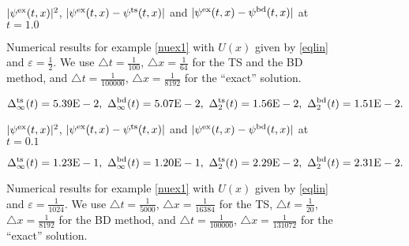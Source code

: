 \documentclass[leqno,final]{siamltex}
\numberwithin{equation}{section}
\newcounter{me}
\begin{document}
\begin{figure} \footnotesize
\begin{center}

$|\psi^{\rm ex}(t,x)|^2$, $|\psi^{\rm ex}(t,x)-\psi^{\rm
ts}(t,x)|$ and $|\psi^{\rm ex}(t,x)-\psi^{\rm bd}(t,x)|$ at
$t=1.0$
\vspace{-1mm} \caption{Numerical results for example
\ref{nuex1} with $U(x)$ given by \eqref{eqlin} and ${{\varepsilon }}={\frac{{1}}{{2}}}$.
We use ${\triangle} t={\frac{{1}}{{100}}}$, ${\triangle} x={\frac{{1}}{{64}}}$ for the TS and the BD
method, and ${\triangle} t={\frac{{1}}{{100000}}}$, ${\triangle} x={\frac{{1}}{{8192}}}$ for the
``exact'' solution.}\vspace{-3mm}
\[\Delta^{\rm ts}_\infty(t)=5.39{\rm{E}}-2,\
\Delta^{\rm bd}_\infty(t)=5.07{\rm{E}}-2,\
\Delta^{\rm ts}_2(t)=1.56{\rm{E}}-2,\
\Delta^{\rm bd}_2(t)= 1.51{\rm{E}}-2. \]
\label{fig18}


$|\psi^{\rm ex}(t,x)|^2$, $|\psi^{\rm ex}(t,x)-\psi^{\rm ts}(t,x)|$
and $|\psi^{\rm ex}(t,x)-\psi^{\rm bd}(t,x)|$ at $t=0.1$\vspace{-1mm}
\end{center}
\caption{Numerical results for example \ref{nuex1} with $U(x)$
given by \eqref{eqlin} and ${{\varepsilon }}={\frac{{1}}{{1024}}}$. We use ${\triangle}
t={\frac{{1}}{{5000}}}$, ${\triangle} x={\frac{{1}}{{16384}}}$ for the TS, ${\triangle}
t={\frac{{1}}{{20}}}$, ${\triangle} x={\frac{{1}}{{8192}}}$ for the BD method, and ${\triangle}
t={\frac{{1}}{{100000}}}$, ${\triangle} x={\frac{{1}}{{131072}}}$ for the ``exact''
solution. }\label{fig19}\vspace{-3mm}
\[\Delta^{\rm ts}_\infty(t)=1.23{\rm{E}}-1,\
\Delta^{\rm bd}_\infty(t)=1.20{\rm{E}}-1,\
\Delta^{\rm ts}_2(t)=2.29{\rm{E}}-2,\
\Delta^{\rm bd}_2(t)= 2.31{\rm{E}}-2.\]
\end{figure}
\end{document}
